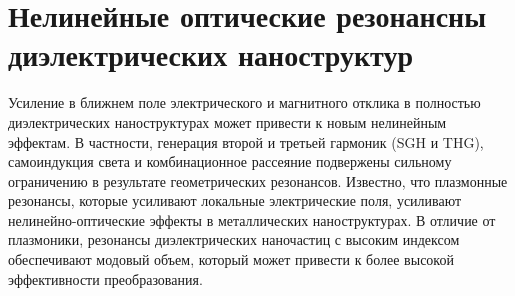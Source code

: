 \section{Нелинейные оптические  резонансны диэлектрических наноструктур}
\hspace*{2mm}
Усиление в ближнем поле электрического и магнитного отклика в полностью диэлектрических наноструктурах может привести к новым нелинейным эффектам. В частности, генерация второй и третьей гармоник (SGH и THG), самоиндукция света и комбинационное рассеяние подвержены сильному ограничению в результате геометрических резонансов. Известно, что плазмонные резонансы, которые усиливают локальные электрические поля, усиливают нелинейно-оптические эффекты в металлических наноструктурах. В отличие от плазмоники, резонансы диэлектрических наночастиц с высоким индексом обеспечивают модовый объем, который может привести к более высокой эффективности преобразования.

